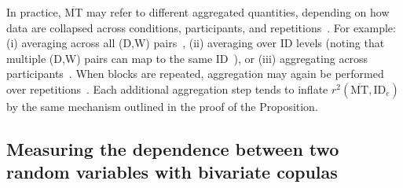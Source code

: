 \documentclass[acmlarge, manuscript,review]{acmart}
\newcommand{\mmt}{\ensuremath{\overline{\mt}}\xspace}
\newcommand{\mt}{\ensuremath{{\text{MT}}}\xspace}
\newcommand{\ide}{\ensuremath{{\text{ID}_e}}\xspace}
\begin{document}
In practice, \mmt may refer to different aggregated quantities, depending on how data are collapsed across conditions, participants, and repetitions~\cite{olafsdottir2012}. For example: (i) averaging across all (D,W) pairs~\cite{soukoreff2004}, (ii) averaging over ID levels (noting that multiple (D,W) pairs can map to the same ID~\cite{gori2018chi}), or (iii) aggregating across participants~\cite{accot1997,mackenzie2008}. When blocks are repeated, aggregation may again be performed over repetitions~\cite{jude2016,guiard2011}. Each additional aggregation step tends to inflate
$r^2(\mmt,\ide)$ by the same mechanism outlined in the proof of the Proposition.

\subsection{Measuring the dependence between two random variables with bivariate copulas\label{sec:copula}}



\end{document}
